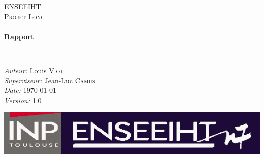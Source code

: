 \begin{titlepage}
\begin{center}

\textsc{\LARGE ENSEEIHT}\\[1.5cm]

\textsc{\Large Projet Long}\\[0.5cm]

\HRule \\[0.4cm]
{ \huge \bfseries Rapport \\[0.4cm] }

\HRule \\[1.5cm]
\end{center}

\vspace{3cm}
\begin{minipage}{0.9\textwidth} \large
\begin{flushleft}
\emph{Auteur:}
Louis \textsc{Viot}\\
\emph{Superviseur:} 
Jean-Luc \textsc{Camus}\\
\emph{Date:}
\today \\
\emph{Version:}
\textsc{1.0}
\end{flushleft}
\end{minipage}
\vspace{5cm}
\begin{center}
\includegraphics[scale=1.5]{enseeiht.jpg}
\end{center}

\end{titlepage}





